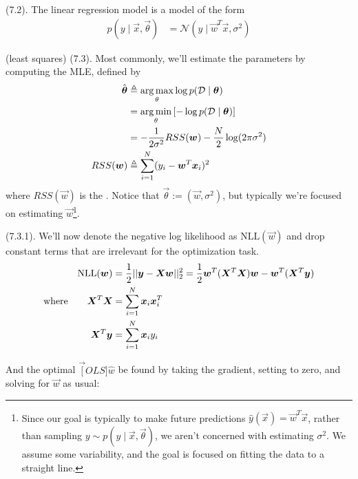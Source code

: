 \documentclass[11pt]{article}
\begin{document}
\p {} (7.2). The linear regression model is a model of the form
\begin{align}
	p(y \mid \vec x, \vec\theta)
		&= \mathcal{N}(y \mid \vec{w}^T \vec x, \sigma^2)
\end{align}

\myspace
\p {} (least squares) (7.3). Most commonly, we'll estimate the parameters by computing the MLE, defined by
\begin{align}
	\hat{\vec{\theta}}
		&\triangleq \argmax_{\theta} \log p(\mathcal D \mid \vec\theta) \\
		&= \argmin_{\theta} \left[ - \log p(\mathcal D \mid \vec\theta) \right] \\
		&= - \inv{2\sigma^2} RSS(\vec w) - \frac{N}{2} \log(2\pi \sigma^2) \\
	RSS(\vec w)
		&\triangleq \sum_{i=1}^{N} (y_i - \vec{w}^T \vec[i]{x})^2
\end{align}
where $RSS(\vec w)$ is the . Notice that $\vec\theta := (\vec w, \sigma^2)$, but typically we're focused on estimating $\vec w$\footnote{Since our goal is typically to make future predictions $\hat y(\vec x) = \vec{w}^T\vec{x}$, rather than sampling $y \sim p(y \mid \vec x, \vec\theta)$, we aren't concerned with estimating $\sigma^2$. We assume some variability, and the goal is focused on fitting the data to a straight line.}. 

\myspace
\p {} (7.3.1). We'll now denote the negative log likelihood as $\text{NLL}(\vec w)$ and drop constant terms that are irrelevant for the optimization task. 
\begin{align}
	\text{NLL}(\vec w)
		&= \onehalf || \vec y - \matr X \vec w ||_2^2
		= \onehalf \vec{w}^T (\matr{X}^T \matr{X}) \vec w - \vec{w}^T (\matr{X}^T \vec y) \\
	\text{where}\qquad
	\matr{X}^T\matr{X}
		&= \sum_{i=1}^{N} \vec[i]{x}\vec[i]{x}^T \\
	\matr{X}^T \vec y
		&= \sum_{i=1}^{N} \vec[i]{x} y_i
\end{align}

And the optimal $\vec[OLS]{\hat w}$ be found by taking the gradient, setting to zero, and solving for $\vec w$ as usual:
\end{document}
